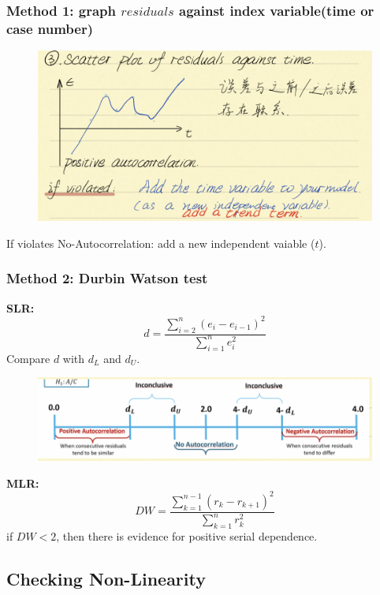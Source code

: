 \documentclass[11pt,a4paper]{article}
\begin{document}
\subsubsection{Method 1: graph $residuals$ against index variable(time or case number)}
\begin{center}\begin{figure}[htbp]
    \centering
    \includegraphics[scale=0.7]{check3.png}
    \caption{}
    \label{}
\end{figure}\end{center}
If violates No-Autocorrelation: add a new independent vaiable ($t$).
\subsubsection{Method 2: Durbin Watson test}
\textbf{SLR:}\\
$$d=\frac{\sum_{i=2}^n(e_i-e_{i-1})^2}{\sum_{i=1}^ne_i^2}$$
Compare $d$ with $d_L$ and $d_U$.
\begin{center}\begin{figure}[htbp]
    \centering
    \includegraphics[scale=0.5]{check4.png}
    \caption{}
    \label{}
\end{figure}\end{center}

\textbf{MLR:}\\
$$DW=\frac{\sum_{k=1}^{n-1}(r_k-r_{k+1})^2}{\sum_{k=1}^nr_k^2}$$
if $DW<2$, then there is evidence for positive serial dependence.

\subsection{Checking Non-Linearity}
\end{document}
